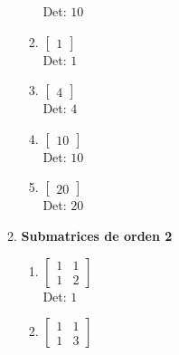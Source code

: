\documentclass[12pt]{article}
\begin{document}
\begin{enumerate}
\begin{enumerate}
\begin{enumerate}
Det: $10$\\


\item $\displaystyle \left[\begin{matrix}1\end{matrix}\right]$\\

Det: $1$\\


\item $\displaystyle \left[\begin{matrix}4\end{matrix}\right]$\\

Det: $4$\\


\item $\displaystyle \left[\begin{matrix}10\end{matrix}\right]$\\

Det: $10$\\


\item $\displaystyle \left[\begin{matrix}20\end{matrix}\right]$\\

Det: $20$\\

\end{enumerate}

\item {\bf Submatrices de orden 2}\\

\begin{enumerate}


\item $\displaystyle \left[\begin{matrix}1 & 1\\1 & 2\end{matrix}\right]$\\

Det: $1$\\


\item $\displaystyle \left[\begin{matrix}1 & 1\\1 & 3\end{matrix}\right]$\\


\end{enumerate}
\end{enumerate}
\end{enumerate}
\end{document}
